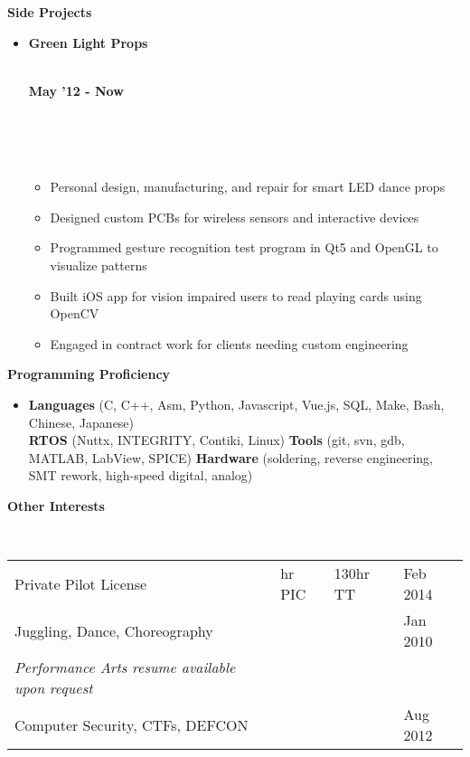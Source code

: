 \documentclass[a4paper,11pt]{article}
\newcommand{\isep}{0 pt}
\newcommand{\resheading}[1]{{\small \colorbox{mygrey}{\begin{minipage}{0.975\textwidth}{\textbf{#1 \vphantom{p\^{E}}}}\end{minipage}}}}
\newcommand{\workexp}[4]{
\begin{minipage}[t]{7cm}
\begin{flushleft}
\textbf{#1} \\
\indent \emph{#2}\\
\end{flushleft}
\end{minipage}
\hfill
\begin{minipage}[t]{7cm}
\begin{flushright}
\textbf{#3} \\
\indent #4 \\
\end{flushright}
\end{minipage}
\\[-0.10in]
}
\begin{document}

\resheading{\textbf{Side Projects}}

\begin{itemize}
\item \workexp{Green Light Props}{}{May '12 - Now}{}
\\[-0.3in]
	\begin{itemize} \itemsep \isep
	\item Personal design, manufacturing, and repair for smart LED dance props
	\item Designed custom PCBs for wireless sensors and interactive devices
	\item Programmed gesture recognition test program in Qt5 and OpenGL to visualize patterns
	\item Built iOS app for vision impaired users to read playing cards using OpenCV
	\item Engaged in contract work for clients needing custom engineering
	\end{itemize}
\end{itemize}



\resheading{\textbf{Programming Proficiency}}
\begin{itemize}
\item \noindent \textbf{Languages} (C, C++, Asm, Python, Javascript, Vue.js, SQL, Make, Bash, Chinese, Japanese)\\
\textbf{RTOS} (Nuttx, INTEGRITY, Contiki, Linux) 
\textbf{Tools} (git, svn, gdb, MATLAB, LabView, SPICE) 
\textbf{Hardware} (soldering, reverse engineering, SMT rework, high-speed digital, analog)
\end{itemize} 



\resheading{\textbf{Other Interests} }
\\[9pt]
\indent \begin{tabular}{   l  l  l  l } 
	\indent Private Pilot License & \indent 40 hr PIC & \indent 130hr TT  \indent & \indent Feb 2014\\
	\indent Juggling, Dance, Choreography \indent \indent \indent & \indent    & \indent  & \indent Jan 2010 \\
	\indent \indent \textit{Performance Arts resume available upon request}  \\
	\indent Computer Security, CTFs, DEFCON & \indent  & \indent  & \indent Aug 2012\\
\end{tabular}

\end{document}
